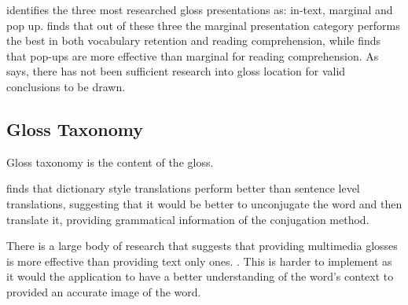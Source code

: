\textcite{chen2016} identifies the three most researched gloss presentations as: in-text, marginal and pop up.  \textcite{abuseileek2008} finds that out of these three the marginal presentation category performs the best in both vocabulary retention and reading comprehension, while \textcite{marefat2016} finds that pop-ups are more effective than marginal for reading comprehension. As \textcite{chen2016} says, there has not been sufficient research into gloss location for valid conclusions to be drawn. 

\subsection{Gloss Taxonomy}
Gloss taxonomy is the content of the gloss.

\textcite{gettys2001} finds that dictionary style translations perform better than sentence level translations, suggesting that it would be better to unconjugate the word and then translate it, providing grammatical information of the conjugation method. 

There is a large body of research that suggests that providing multimedia glosses is more effective than providing text only ones. \autocite{yoshii2006, kost1999}. This is harder to implement  as it would the application to have a better understanding of the word's context to provided an accurate image of the word. 
